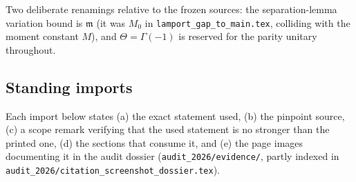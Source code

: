 \documentclass[11pt,a4paper]{article}
\theoremstyle{plain}
\theoremstyle{definition}
\theoremstyle{plain}
\theoremstyle{definition}
\begin{document}
Two deliberate renamings relative to the frozen sources: the separation-lemma variation bound
is $\mathfrak m$ (it was $M_0$ in \texttt{lamport\_gap\_to\_main.tex}, colliding with the
moment constant $M$), and $\Theta=\Gamma(-1)$ is reserved for the parity unitary throughout.

\subsection{Standing imports}\label{subsec:imports}

Each import below states (a) the exact statement used, (b) the pinpoint source, (c) a scope
remark verifying that the used statement is no stronger than the printed one, (d) the sections
that consume it, and (e) the page images documenting it in the audit dossier
(\texttt{audit\_2026/}\allowbreak\texttt{evidence/}, partly indexed in
\texttt{audit\_2026/}\allowbreak\texttt{citation\_screenshot\_dossier.tex}).
\end{document}
